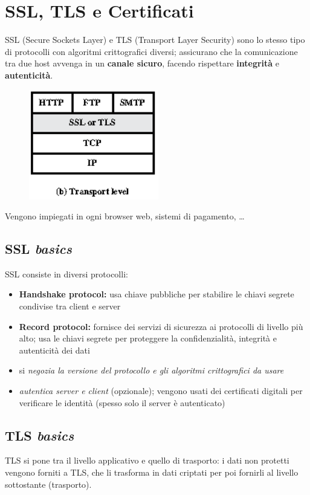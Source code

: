 \chapter{SSL, TLS e Certificati}

SSL (Secure Sockets Layer) e TLS (Transport Layer Security) sono lo stesso 
tipo di protocolli con algoritmi crittografici diversi; assicurano che la comunicazione
tra due host avvenga in un \textbf{canale sicuro}, facendo rispettare \textbf{integrità}
e \textbf{autenticità}. 

\begin{figure}[H]
    \centering
    \includegraphics[width=0.4\linewidth]{chapters/10/images/intro.png}
\end{figure}

\noindent Vengono impiegati in ogni browser web, sistemi di pagamento, \dots

\section{SSL \textit{basics}}
SSL consiste in diversi protocolli:
\begin{itemize}
    \item \textbf{Handshake protocol:} usa chiave pubbliche per stabilire le chiavi 
    segrete condivise tra client e server 
    \item \textbf{Record protocol:} fornisce dei servizi di sicurezza ai protocolli di livello 
    più alto; usa le chiavi segrete per proteggere la confidenzialità, integrità e autenticità
    dei dati
    \item si \textit{negozia la versione del protocollo e gli algoritmi 
    crittografici da usare}
    \item \textit{autentica server e client} (opzionale); vengono usati dei certificati
    digitali per verificare le identità (spesso solo il server è autenticato)
\end{itemize}

\section{TLS \textit{basics}}
TLS si pone tra il livello applicativo e quello di trasporto: i dati non protetti 
vengono forniti a TLS, che li trasforma in dati criptati per poi fornirli al livello 
sottostante (trasporto).

